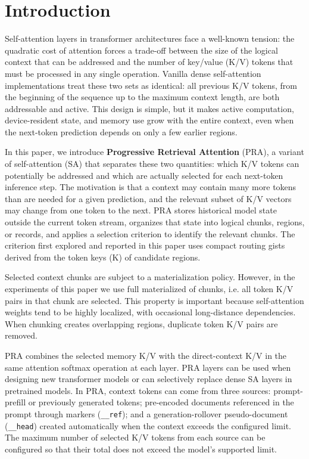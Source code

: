 \documentclass[11pt]{article}
\begin{document}
\section{Introduction}

Self-attention layers in transformer architectures face a well-known tension:
the quadratic cost of attention forces a trade-off between the size of the logical
context that can be addressed and the number of key/value (K/V) tokens that must be
processed in any single operation. Vanilla dense self-attention implementations
treat these two sets as identical: all previous K/V tokens, from the beginning of the
sequence up to the maximum context length, are both addressable and active.
This design is simple, but it makes active computation, device-resident state, and
memory use grow with the entire context, even when the next-token prediction depends
on only a few earlier regions.

In this paper, we introduce \textbf{Progressive Retrieval Attention} (PRA), a variant
of self-attention (SA) that separates these two quantities: which K/V tokens can
potentially be addressed and which are actually selected for each next-token inference
step. The motivation is that a context may contain many more tokens than are needed for
a given prediction, and the relevant subset of K/V vectors may change from one token to
the next. PRA stores historical model state outside the current token stream, organizes
that state into logical chunks, regions, or records, and applies a selection criterion
to identify the relevant chunks. The criterion first explored and reported in this paper
uses compact routing gists derived from the token keys (K) of candidate regions.


Selected context chunks are subject to a materialization policy. 
However, in the experiments of this paper we use full materialized of chunks,
i.e. all token K/V pairs in that chunk are selected. 
This property is important because self-attention weights
tend to be highly localized, with occasional long-distance dependencies. When chunking
creates overlapping regions, duplicate token K/V pairs are removed.

PRA combines the selected memory K/V with the direct-context K/V in the same attention
\textsf{softmax} operation at each layer. PRA layers can be used when designing new
transformer models or can selectively replace dense SA layers in pretrained models.
In PRA, context tokens can come from three sources: prompt-prefill or previously generated
tokens; pre-encoded documents referenced in the prompt through markers
(\texttt{\_\_ref}); and a generation-rollover pseudo-document (\texttt{\_\_head})
created automatically when the context exceeds the configured limit. The maximum number
of selected K/V tokens from each source can be configured so that their total does not
exceed the model's supported limit.
\end{document}
